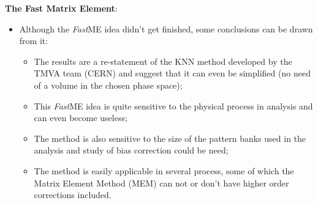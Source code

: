 \newpage
{\flushleft \textbf{The Fast Matrix Element}:}
\begin{itemize}
	\item Although the \textit{Fast}ME idea didn't get finished, some conclusions can be drawn from it:
	\begin{itemize}
		\item The results are a re-statement of the KNN method developed by the TMVA team (CERN) and suggest that it can even be simplified (no need of a volume in the chosen phase space);
		\item This \textit{Fast}ME idea is quite sensitive to the physical process in analysis and can even become useless;
		\item The method is also sensitive to the size of the pattern banks used in the analysis and study of bias correction could be need;
		\item The method is easily applicable in several process, some of which the Matrix Element Method (MEM) can not or don't have higher order corrections included.
	\end{itemize}
\end{itemize}
	

